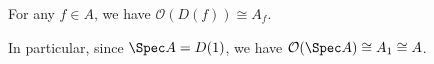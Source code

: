 For any $f \in A$, we have $\mathcal{O}(D(f)) \cong A_f$.

In particular, since $\Spec A = D(1)$, we have $\mathcal{O}(\Spec A) \cong A_1 \cong A$.
